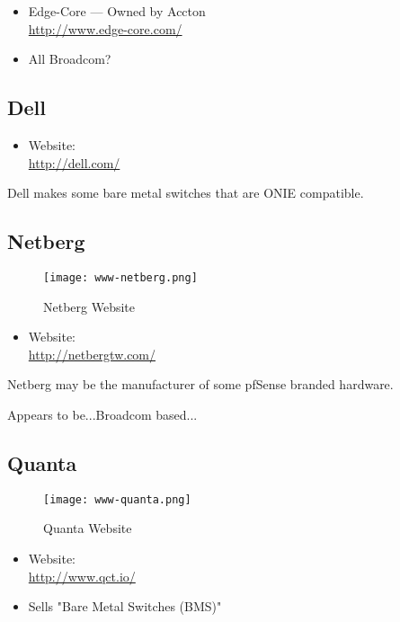 \begin{itemize}
 \item Edge-Core --- Owned by Accton \\ \url{http://www.edge-core.com/}
 \item All Broadcom?
\end{itemize}


\subsection{Dell}
\begin{itemize}
 \item Website: \\ \url{http://dell.com/}
\end{itemize}

Dell makes some bare metal switches that are ONIE compatible.


\subsection{Netberg}
\begin{figure}[h!]
\texttt{[image: www-netberg.png]}
 \caption{Netberg Website}
 \label{fig:www-netberg}
\end{figure}


\begin{itemize}
 \item Website: \\ \url{http://netbergtw.com/}
\end{itemize}


Netberg may be the manufacturer of some pfSense branded hardware.


Appears to be...Broadcom based...


\subsection{Quanta}
\begin{figure}[h!]
\texttt{[image: www-quanta.png]}
 \caption{Quanta Website}
 \label{fig:www-quanta}
\end{figure}


\begin{itemize}
 \item Website: \\ \url{http://www.qct.io/}
 \item Sells "Bare Metal Switches (BMS)"
\end{itemize}


